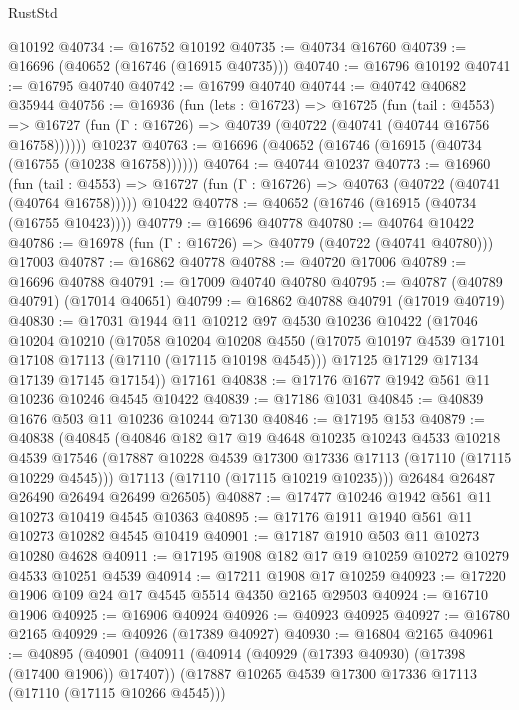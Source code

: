 \begin{lexlean}{RustStd}
\begin{coremodule}
    @10192
@40734 := @16752 @10192
@40735 := @40734 @16760
@40739 := @16696 (@40652 (@16746 (@16915 @40735)))
@40740 := @16796 @10192
@40741 := @16795 @40740
@40742 := @16799 @40740
@40744 := @40742 @40682 @35944
@40756 := @16936
    (fun (lets : @16723) =>
    @16725
      (fun (tail : @4553) =>
      @16727 (fun (Γ : @16726) => @40739 (@40722 (@40741 (@40744 @16756 @16758))))))
    @10237
@40763 := @16696 (@40652 (@16746 (@16915 (@40734 (@16755 (@10238 @16758))))))
@40764 := @40744 @10237
@40773 := @16960
    (fun (tail : @4553) => @16727 (fun (Γ : @16726) => @40763 (@40722 (@40741 (@40764 @16758)))))
    @10422
@40778 := @40652 (@16746 (@16915 (@40734 (@16755 @10423))))
@40779 := @16696 @40778
@40780 := @40764 @10422
@40786 := @16978 (fun (Γ : @16726) => @40779 (@40722 (@40741 @40780))) @17003
@40787 := @16862 @40778
@40788 := @40720 @17006
@40789 := @16696 @40788
@40791 := @17009 @40740 @40780
@40795 := @40787 (@40789 @40791) (@17014 @40651)
@40799 := @16862 @40788 @40791 (@17019 @40719)
@40830 := @17031
    @1944
    @11
    @10212
    @97
    @4530
    @10236
    @10422
    (@17046
      @10204
      @10210
      (@17058
        @10204
        @10208
        @4550
        (@17075 @10197 @4539 @17101 @17108 @17113 (@17110 (@17115 @10198 @4545)))
        @17125
        @17129
        @17134
        @17139
        @17145
        @17154))
    @17161
@40838 := @17176 @1677 @1942 @561 @11 @10236 @10246 @4545 @10422
@40839 := @17186 @1031
@40845 := @40839 @1676 @503 @11 @10236 @10244 @7130
@40846 := @17195 @153
@40879 := @40838
    (@40845
      (@40846
        @182
        @17
        @19
        @4648
        @10235
        @10243
        @4533
        @10218
        @4539
        @17546
        (@17887 @10228 @4539 @17300 @17336 @17113 (@17110 (@17115 @10229 @4545)))
        @17113
        (@17110 (@17115 @10219 @10235)))
      @26484
      @26487
      @26490
      @26494
      @26499
      @26505)
@40887 := @17477 @10246 @1942 @561 @11 @10273 @10419 @4545 @10363
@40895 := @17176 @1911 @1940 @561 @11 @10273 @10282 @4545 @10419
@40901 := @17187 @1910 @503 @11 @10273 @10280 @4628
@40911 := @17195 @1908 @182 @17 @19 @10259 @10272 @10279 @4533 @10251 @4539
@40914 := @17211 @1908 @17 @10259
@40923 := @17220 @1906 @109 @24 @17 @4545 @5514 @4350 @2165 @29503
@40924 := @16710 @1906
@40925 := @16906 @40924
@40926 := @40923 @40925
@40927 := @16780 @2165
@40929 := @40926 (@17389 @40927)
@40930 := @16804 @2165
@40961 := @40895
    (@40901
      (@40911
        (@40914 (@40929 (@17393 @40930) (@17398 (@17400 @1906)) @17407))
        (@17887 @10265 @4539 @17300 @17336 @17113 (@17110 (@17115 @10266 @4545)))

\end{coremodule}
\end{lexlean}
